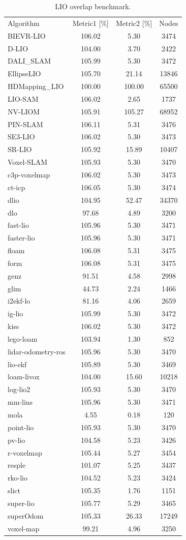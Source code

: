\begin{table}[]
\centering
\begin{tabular}{lccc}
\rowcolor[HTML]{C0C0C0}
Algorithm & Metric1 [\%] & Metric2 [\%] & Nodes \\
BIEVR-LIO & 106.02 & 5.30 & 3474 \\
D-LIO & 104.00 & 3.70 & 2422 \\
DALI_SLAM & 105.99 & 5.30 & 3472 \\
EllipseLIO & 105.70 & 21.14 & 13846 \\
HDMapping_LIO & 100.00 & 100.00 & 65500 \\
LIO-SAM & 106.02 & 2.65 & 1737 \\
NV-LIOM & 105.91 & 105.27 & 68952 \\
PIN-SLAM & 106.11 & 5.31 & 3476 \\
SE3-LIO & 106.02 & 5.30 & 3473 \\
SR-LIO & 105.92 & 15.89 & 10407 \\
Voxel-SLAM & 105.93 & 5.30 & 3470 \\
c3p-voxelmap & 106.02 & 5.30 & 3473 \\
ct-icp & 106.05 & 5.30 & 3474 \\
dlio & 104.95 & 52.47 & 34370 \\
dlo & 97.68 & 4.89 & 3200 \\
fast-lio & 105.96 & 5.30 & 3471 \\
faster-lio & 105.96 & 5.30 & 3471 \\
floam & 106.08 & 5.31 & 3475 \\
form & 106.08 & 5.31 & 3475 \\
genz & 91.51 & 4.58 & 2998 \\
glim & 44.73 & 2.24 & 1466 \\
i2ekf-lo & 81.16 & 4.06 & 2659 \\
ig-lio & 105.99 & 5.30 & 3472 \\
kiss & 106.02 & 5.30 & 3472 \\
lego-loam & 103.94 & 1.30 & 852 \\
lidar-odometry-ros & 105.96 & 5.30 & 3470 \\
lio-ekf & 105.89 & 5.30 & 3469 \\
loam-livox & 104.00 & 15.60 & 10218 \\
log-lio2 & 105.93 & 5.30 & 3470 \\
mm-lins & 105.96 & 5.30 & 3471 \\
mola & 4.55 & 0.18 & 120 \\
point-lio & 105.93 & 5.30 & 3470 \\
pv-lio & 104.58 & 5.23 & 3426 \\
r-voxelmap & 105.44 & 5.27 & 3454 \\
resple & 101.07 & 5.25 & 3437 \\
rko-lio & 104.52 & 5.23 & 3424 \\
slict & 105.35 & 1.76 & 1151 \\
super-lio & 105.77 & 5.29 & 3465 \\
superOdom & 105.33 & 26.33 & 17249 \\
voxel-map & 99.21 & 4.96 & 3250 \\
\end{tabular}
\caption{LIO overlap benchmark.}
\label{tab:lio_overlap}
\end{table}